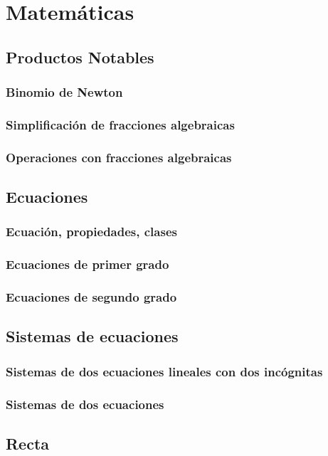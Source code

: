 \section{Matemáticas}

\subsection{Productos Notables}
\subsubsection{Binomio de Newton}
\subsubsection{Simplificación de fracciones algebraicas}
\subsubsection{Operaciones con fracciones algebraicas}

\subsection{Ecuaciones}
\subsubsection{Ecuación, propiedades, clases}
\subsubsection{Ecuaciones de primer grado}
\subsubsection{Ecuaciones de segundo grado}

\subsection{Sistemas de ecuaciones}
\subsubsection{Sistemas de dos ecuaciones lineales con dos incógnitas}
\subsubsection{Sistemas de dos ecuaciones}

\subsection{Recta}
